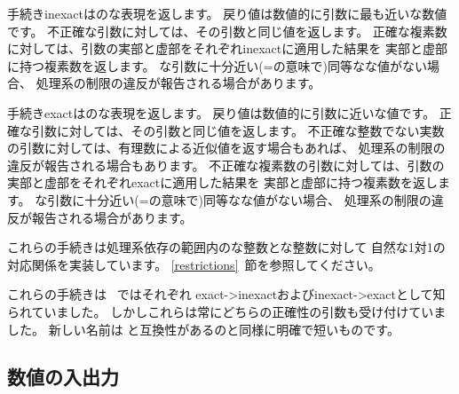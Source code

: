 \begin{entry}{%
}

手続き{\cf inexact}はのな表現を返します。
戻り値は数値的に引数に最も近いな数値です。
不正確な引数に対しては、その引数と同じ値を返します。
正確な複素数に対しては、引数の実部と虚部をそれぞれ{\cf inexact}に適用した結果を
実部と虚部に持つ複素数を返します。
な引数に十分近い({\cf =}の意味で)同等なな値がない場合、
処理系の制限の違反が報告される場合があります。

手続き{\cf exact}はのな表現を返します。
戻り値は数値的に引数に近いな値です。
正確な引数に対しては、その引数と同じ値を返します。
不正確な整数でない実数の引数に対しては、有理数による近似値を返す場合もあれば、
処理系の制限の違反が報告される場合もあります。
不正確な複素数の引数に対しては、引数の実部と虚部をそれぞれ{\cf exact}に適用した結果を
実部と虚部に持つ複素数を返します。
な引数に十分近い({\cf =}の意味で)同等なな値がない場合、
処理系の制限の違反が報告される場合があります。

これらの手続きは処理系依存の範囲内のな整数とな整数に対して
自然な1対1の対応関係を実装しています。
\ref{restrictions}~節を参照してください。

\begin{note}
これらの手続きは \rfivers\ ではそれぞれ
{\cf exact->inexact}および{\cf inexact->exact}として知られていました。
しかしこれらは常にどちらの正確性の引数も受け付けていました。
新しい名前は \rsixrs と互換性があるのと同様に明確で短いものです。
\end{note}

\end{entry}

\medskip

\subsection{数値の入出力}

